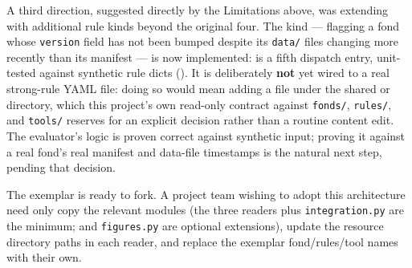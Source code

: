 \documentclass[
]{article}
\begin{document}
A third direction, suggested directly by the Limitations above, was
extending  with additional rule kinds
beyond the original four. The  kind ---
flagging a fond whose \texttt{version} field has not been bumped despite
its \texttt{data/} files changing more recently than its manifest --- is
now implemented:
is a fifth dispatch entry, unit-tested against synthetic rule dicts
(). It is
deliberately \textbf{not} yet wired to a real strong-rule YAML file:
doing so would mean adding a file under the shared
 or
 directory,
which this project's own read-only contract against \texttt{fonds/},
\texttt{rules/}, and \texttt{tools/} reserves for an explicit decision
rather than a routine content edit. The evaluator's logic is proven
correct against synthetic input; proving it against a real fond's real
manifest and data-file timestamps is the natural next step, pending that
decision.

The exemplar is ready to fork. A project team wishing to adopt this
architecture need only copy the relevant
 modules (the three readers
plus \texttt{integration.py} are the minimum;
 and \texttt{figures.py} are optional
extensions), update the resource directory paths in each reader, and
replace the exemplar fond/rules/tool names with their own.



\clearpage


\end{document}
